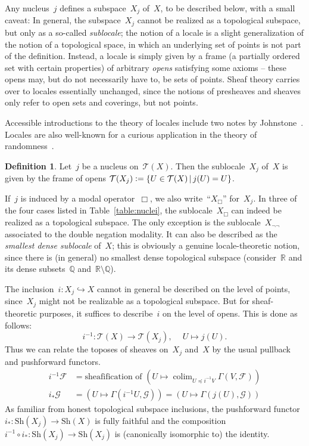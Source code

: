\documentclass[10pt,reqno,a4paper]{amsbook}
\theoremstyle{definition}
\newtheorem{defn}{Definition}[section]
\theoremstyle{plain}
\theoremstyle{remark}
\newcommand{\F}{\mathcal{F}}
\renewcommand{\G}{\mathcal{G}}
\newcommand{\T}{\mathcal{T}}
\newcommand{\RR}{\mathbb{R}}
\newcommand{\QQ}{\mathbb{Q}}
\newcommand{\Sh}{\mathrm{Sh}}
\DeclareMathOperator*{\colim}{colim}
\newcommand{\Open}{\T}
\newcommand{\?}{\,{:}\,}
\renewcommand{\_}{\mathpunct{.}\,}
\newcommand{\lra}{\longrightarrow}
\newcommand{\defeq}{\vcentcolon=}
\begin{document}
Any nucleus~$j$ defines a subspace~$X_j$ of~$X$, to be described below, with a small caveat: In
general, the subspace~$X_j$ cannot be realized as a topological subspace, but
only as a so-called \emph{sublocale}; the notion of a locale is a slight
generalization of the notion of a topological space, in which an underlying set
of points is not part of the definition. Instead, a locale is simply given by a
frame (a partially ordered set with certain properties) of arbitrary \emph{opens} satisfying some axioms -- these opens may, but do not necessarily have to,
be sets of points. Sheaf theory carries over to locales essentially unchanged,
since the notions of presheaves and sheaves only refer to open sets and coverings,
but not points.

Accessible introductions to the theory of locales include two notes by
Johnstone~\cite{johnstone:art,johnstone:point}. Locales are also well-known for
a curious application in the theory of
randomness~\cite{simpson:random1,simpson:random2}.

\begin{defn}\label{defn:subspace-by-nucleus}Let~$j$ be a nucleus on~$\Open(X)$.
Then the sublocale~$X_j$ of~$X$ is given by the frame of opens
$\Open(X_j) \defeq \{ U \in \Open(X) \,|\, j(U) = U \}$.
\end{defn}
If~$j$ is induced by a modal operator~$\Box$, we also write~``$X_\Box$''
for~$X_j$. In three of the four cases listed in Table~\ref{table:nuclei}, the
sublocale~$X_\Box$ can indeed be realized as a topological subspace. The only
exception is the sublocale~$X_{\neg\neg}$ associated to the double negation
modality. It can also be described as the \emph{smallest dense sublocale}
of~$X$; this is obviously a genuine locale-theoretic notion, since there
is (in general) no smallest dense topological subspace
(consider~$\RR$ and its dense subsets~$\QQ$ and~$\RR \setminus \QQ$).

The inclusion~$i : X_j \hookrightarrow X$ cannot in general be described on the
level of points, since~$X_j$ might not be realizable as a topological subspace.
But for sheaf-theoretic purposes, it suffices to describe~$i$ on the level of
opens. This is done as follows:
\[ i^{-1} : \Open(X) \lra \Open(X_j),\ \quad U \longmapsto j(U). \]
Thus we can relate the toposes of sheaves on~$X_j$ and~$X$ by the usual
pullback and pushforward functors.
\begin{align*}
  i^{-1} \F &= \text{sheafification of $(U \mapsto \colim_{U \preceq i^{-1}V} \Gamma(V,\F))$} \\
  i_* \G &= (U \mapsto \Gamma(i^{-1}U, \G)) = (U \mapsto \Gamma(j(U), \G))
\end{align*}
As familiar from honest topological subspace inclusions, the pushforward
functor~$i_* : \Sh(X_j) \to \Sh(X)$ is fully faithful and the composition~$i^{-1}
\circ i_* : \Sh(X_j) \to \Sh(X_j)$ is (canonically isomorphic to) the identity.
\end{document}

